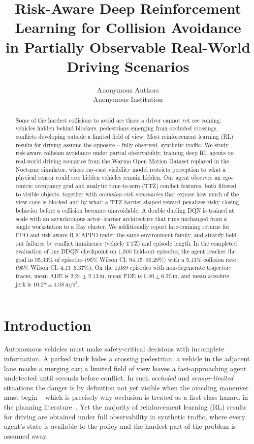 \documentclass{article}
\title{\textbf{Risk-Aware Deep Reinforcement Learning for Collision Avoidance\\
in Partially Observable Real-World Driving Scenarios}}
\author{%
  Anonymous Authors\\
  Anonymous Institution
}
\date{}
\begin{document}
\maketitle

\begin{abstract}
Some of the hardest collisions to avoid are those a driver cannot yet see
coming: vehicles hidden behind blockers, pedestrians emerging from occluded
crossings, conflicts developing outside a limited field of view. Most
reinforcement learning (RL) results for driving assume the opposite --
fully observed, synthetic traffic. We study risk-aware collision avoidance
under partial observability, training deep RL agents on real-world driving
scenarios from the Waymo Open Motion Dataset replayed in the Nocturne
simulator, whose ray-cast visibility model restricts perception to what a
physical sensor could see: hidden vehicles remain hidden. Our agent
observes an ego-centric occupancy grid and analytic time-to-zero (TTZ)
conflict features, both filtered to visible objects, together with
\emph{occlusion-risk summaries} that expose how much of the view cone is
blocked and by what; a TTZ-barrier shaped reward penalizes risky closing
behavior before a collision becomes unavoidable. A double dueling DQN is
trained at scale with an asynchronous actor--learner architecture that runs
unchanged from a single workstation to a Ray cluster. We additionally report
late-training returns for PPO and risk-aware R-MAPPO under the same
environment family, and stratify held-out failures by conflict imminence
(vehicle TTZ) and episode length. In the completed evaluation of one DDQN
checkpoint on 1{,}500 held-out episodes, the agent reaches the goal in
95.33\% of episodes (95\% Wilson CI: 94.15--96.29\%) with a 5.13\%
collision rate (95\% Wilson CI: 4.13--6.37\%). On the 1{,}089 episodes with
non-degenerate trajectory traces, mean ADE is $2.24 \pm 2.13$\,m, mean FDE
is $6.40 \pm 6.20$\,m, and mean absolute jerk is
$10.27 \pm 4.08$\,m/s$^3$.
\end{abstract}

\section{Introduction}
\label{sec:introduction}

Autonomous vehicles must make safety-critical decisions with incomplete
information. A parked truck hides a crossing pedestrian; a vehicle in the
adjacent lane masks a merging car; a limited field of view leaves a
fast-approaching agent undetected until seconds before conflict. In such
\emph{occluded} and \emph{sensor-limited} situations the danger is by
definition not yet visible when the avoiding maneuver must begin -- which is
precisely why occlusion is treated as a first-class hazard in the planning
literature~\citep{orzechowski2018tackling, bouton2018scalable}. Yet the
majority of reinforcement learning (RL) results for driving are obtained
under full observability in synthetic traffic, where every agent's state is
available to the policy and the hardest part of the problem is assumed away.
\end{document}

